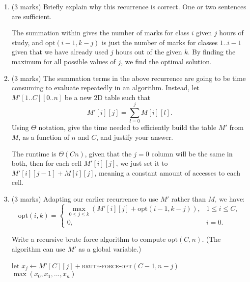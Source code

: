 \documentclass[11pt]{article}
\newcommand{\opt}{\mbox{opt}}
\begin{document}
\begin{enumerate}
\item (3 marks)
  Briefly explain why this recurrence is correct. One or two sentences are sufficient.

\begin{soln}
The summation within gives the number of marks for class $i$ given $j$ hours of study, and $\opt(i-1,k-j)$ is just the number of marks for classes $1..i-1$ given that we have already used $j$ hours out of the given $k$. By finding the maximum for all possible values of $j$, we find the optimal solution.
\end{soln}

\item (3 marks)
  The summation terms in the above recurrence are going to be time consuming to evaluate repeatedly in an algorithm. Instead, let $M'[1..C][0..n]$ be a new 2D table such that
  \[
  M'[i][j] = \sum_{l=0}^j M[i][l].
  \]
  Using $\Theta$ notation, give the time needed to efficiently build the table $M'$ from $M$, as a function of $n$ and $C$, and justify your answer.

\begin{soln}
The runtime is $\Theta(Cn)$, given that the $j=0$ column will be the same in both, then for each cell $M'[i][j]$, we just set it to $M'[i][j-1] + M[i][j]$, meaning a constant amount of accesses to each cell.
\end{soln}

\newpage

\item (3 marks)
Adapting our earlier recurrence to use $M'$ rather than $M$, we have:
\[
\opt(i,k) = \left\{
\begin{array}{ll}
\max_{0 \le j \le k} (M'[i][j] + \opt(i-1,k-j)), & 1\le i \le C, \\
0, & i = 0.
\end{array}
\right.
\]

Write a recursive brute force algorithm to compute $\opt(C,n)$.
(The algorithm can use $M'$ as a global variable.)

\begin{soln}
\begin{algorithmic}[1]
\State {}
\Else
{}
\State let $x_j \gets M'[C][j] + $\textsc{brute-force-opt}$(C-1,n-j)$\
\EndFor
\State \Return $\max (x_0, x_1, ... , x_n)$
\EndIf
\EndFunction

\end{algorithmic}
\end{soln}


\end{enumerate}
\end{document}
